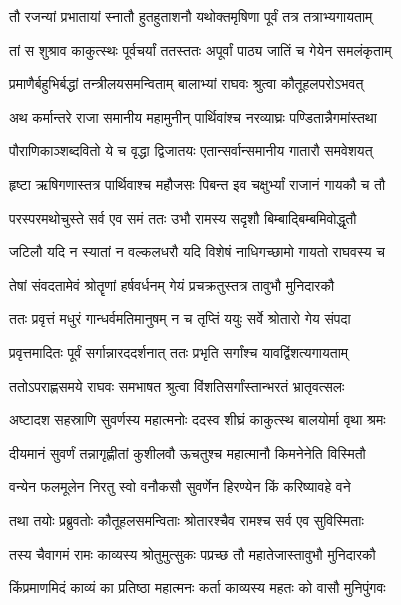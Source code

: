 \twolineshloka
{तौ रजन्यां प्रभातायां स्नातौ हुतहुताशनौ}
{यथोक्तमृषिणा पूर्वं तत्र तत्राभ्यगायताम्} %

\twolineshloka
{तां स शुश्राव काकुत्स्थः पूर्वचर्यां ततस्ततः}
{अपूर्वां पाठ्य जातिं च गेयेन समलंकृताम्} %

\twolineshloka
{प्रमाणैर्बहुभिर्बद्धां तन्त्रीलयसमन्विताम्}
{बालाभ्यां राघवः श्रुत्वा कौतूहलपरोऽभवत्} %

\twolineshloka
{अथ कर्मान्तरे राजा समानीय महामुनीन्}
{पार्थिवांश्च नरव्याघ्रः पण्डितान्नैगमांस्तथा} %

\twolineshloka
{पौराणिकाञ्शब्दवितो ये च वृद्धा द्विजातयः}
{एतान्सर्वान्समानीय गातारौ समवेशयत्} %

\twolineshloka
{हृष्टा ऋषिगणास्तत्र पार्थिवाश्च महौजसः}
{पिबन्त इव चक्षुर्भ्यां राजानं गायकौ च तौ} %

\twolineshloka
{परस्परमथोचुस्ते सर्व एव समं ततः}
{उभौ रामस्य सदृशौ बिम्बाद्बिम्बमिवोद्धृतौ} %

\twolineshloka
{जटिलौ यदि न स्यातां न वल्कलधरौ यदि}
{विशेषं नाधिगच्छामो गायतो राघवस्य च} %

\twolineshloka
{तेषां संवदतामेवं श्रोतॄणां हर्षवर्धनम्}
{गेयं प्रचक्रतुस्तत्र तावुभौ मुनिदारकौ} %

\twolineshloka
{ततः प्रवृत्तं मधुरं गान्धर्वमतिमानुषम्}
{न च तृप्तिं ययुः सर्वे श्रोतारो गेय संपदा} %

\twolineshloka
{प्रवृत्तमादितः पूर्वं सर्गान्नारददर्शनात्}
{ततः प्रभृति सर्गांश्च यावद्विंशत्यगायताम्} %

\twolineshloka
{ततोऽपराह्णसमये राघवः समभाषत}
{श्रुत्वा विंशतिसर्गांस्तान्भरतं भ्रातृवत्सलः} %

\twolineshloka
{अष्टादश सहस्राणि सुवर्णस्य महात्मनोः}
{ददस्व शीघ्रं काकुत्स्थ बालयोर्मा वृथा श्रमः} %

\twolineshloka
{दीयमानं सुवर्णं तन्नागृह्णीतां कुशीलवौ}
{ऊचतुश्च महात्मानौ किमनेनेति विस्मितौ} %

\twolineshloka
{वन्येन फलमूलेन निरतु स्वो वनौकसौ}
{सुवर्णेन हिरण्येन किं करिष्यावहे वने} %

\twolineshloka
{तथा तयोः प्रब्रुवतोः कौतूहलसमन्विताः}
{श्रोतारश्चैव रामश्च सर्व एव सुविस्मिताः} %

\twolineshloka
{तस्य चैवागमं रामः काव्यस्य श्रोतुमुत्सुकः}
{पप्रच्छ तौ महातेजास्तावुभौ मुनिदारकौ} %

\twolineshloka
{किंप्रमाणमिदं काव्यं का प्रतिष्ठा महात्मनः}
{कर्ता काव्यस्य महतः को वासौ मुनिपुंगवः} %

